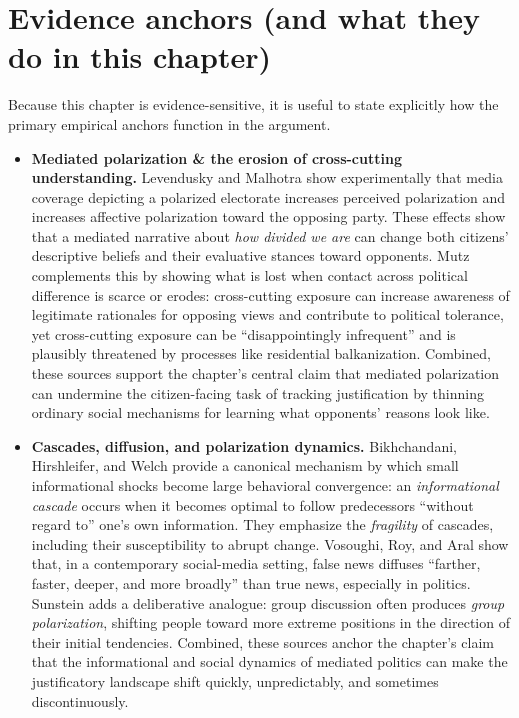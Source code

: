 \documentclass[12pt]{report}
\begin{document}
\section*{Evidence anchors (and what they do in this chapter)}

Because this chapter is evidence-sensitive, it is useful to state explicitly how the primary empirical anchors function in the argument.

\begin{itemize}
  \item \textbf{Mediated polarization \& the erosion of cross-cutting understanding.} Levendusky and Malhotra show experimentally that media coverage depicting a polarized electorate increases perceived polarization\parencite[p.~290]{levenduskyMalhotra2016polarization} and increases affective polarization toward the opposing party.\parencite[p.~292]{levenduskyMalhotra2016polarization} These effects show that a mediated narrative about \emph{how divided we are} can change both citizens’ descriptive beliefs and their evaluative stances toward opponents. Mutz complements this by showing what is lost when contact across political difference is scarce or erodes: cross-cutting exposure can increase awareness of legitimate rationales for opposing views and contribute to political tolerance,\parencite[p.~118]{mutz2002crosscutting} yet cross-cutting exposure can be \enquote{disappointingly infrequent} and is plausibly threatened by processes like residential balkanization.\parencite[pp.~111, 122]{mutz2002crosscutting} Combined, these sources support the chapter’s central claim that mediated polarization can undermine the citizen-facing task of tracking justification by thinning ordinary social mechanisms for learning what opponents’ reasons look like.
  \item \textbf{Cascades, diffusion, and polarization dynamics.} Bikhchandani, Hirshleifer, and Welch provide a canonical mechanism by which small informational shocks become large behavioral convergence: an \emph{informational cascade} occurs when it becomes optimal to follow predecessors \enquote{without regard to} one’s own information.\parencite[p.~992]{bikhchandaniHirshleiferWelch1992cascades} They emphasize the \emph{fragility} of cascades, including their susceptibility to abrupt change.\parencite[p.~996]{bikhchandaniHirshleiferWelch1992cascades} Vosoughi, Roy, and Aral show that, in a contemporary social-media setting, false news diffuses \enquote{farther, faster, deeper, and more broadly} than true news, especially in politics.\parencite[p.~1146]{vosoughiRoyAral2018falseNews} Sunstein adds a deliberative analogue: group discussion often produces \emph{group polarization}, shifting people toward more extreme positions in the direction of their initial tendencies.\parencite[p.~176]{sunstein2002groupPolarization} Combined, these sources anchor the chapter’s claim that the informational and social dynamics of mediated politics can make the justificatory landscape shift quickly, unpredictably, and sometimes discontinuously.
\end{itemize}
\end{document}
